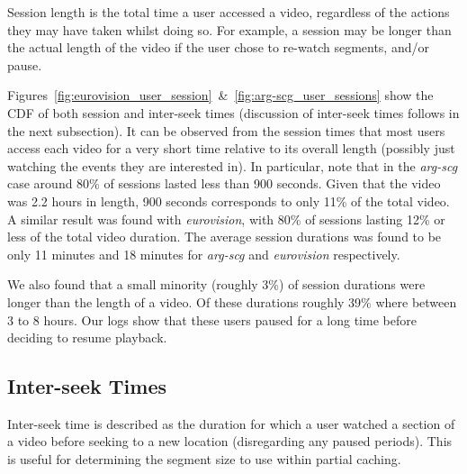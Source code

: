 \documentclass[a4paper,11pt]{article}
\begin{document}
Session length is the total time a user accessed a video, regardless of the actions they may have taken whilst doing so. For example, a session may be longer than the actual length of the video if the user chose to re-watch segments, and/or pause.

Figures~\ref{fig:eurovision_user_session}~\&~\ref{fig:arg-scg_user_sessions} show the CDF of both session and inter-seek times (discussion of inter-seek times follows in the next subsection). It can be observed from the session times that most users access each video for a very short time relative to its overall length (possibly just watching the events they are interested in). In particular, note that in the \emph{arg-scg} case around 80\% of sessions lasted less than 900 seconds. Given that the video was 2.2 hours in length, 900 seconds corresponds to only 11\% of the total video. A similar result was found with \emph{eurovision}, with 80\% of sessions lasting 12\% or less of the total video duration. The average session durations was found to be only 11 minutes and 18 minutes for \emph{arg-scg} and \emph{eurovision} respectively.

We also found that a small minority (roughly 3\%) of session durations were longer than the length of a video. Of these durations roughly 39\% where between 3 to 8 hours. Our logs show that these users paused for a long time before deciding to resume playback.



\subsection{Inter-seek Times}
\label{sect:interseek}

Inter-seek time is described as the duration for which a user watched a section of a video before seeking to a new location (disregarding any paused periods). This is useful for determining the segment size to use within partial caching.
\end{document}
